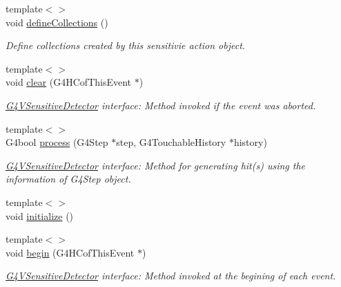\begin{DoxyCompactItemize}
{\footnotesize template$<$$>$ }\\void \hyperlink{class_d_d4hep_1_1_simulation_1_1_geant4_sensitive_action_a827b5e46eae9a7b69e91d6f0ee58733d}{defineCollections} ()
\begin{DoxyCompactList}\small\item\em Define collections created by this sensitivie action object. \item\end{DoxyCompactList}\item 
{\footnotesize template$<$$>$ }\\void \hyperlink{class_d_d4hep_1_1_simulation_1_1_geant4_sensitive_action_aa7ffb4125e622d9eb08bfd4901a643fd}{clear} (G4HCofThisEvent $\ast$)
\begin{DoxyCompactList}\small\item\em \hyperlink{class_g4_v_sensitive_detector}{G4VSensitiveDetector} interface: Method invoked if the event was aborted. \item\end{DoxyCompactList}\item 
{\footnotesize template$<$$>$ }\\G4bool \hyperlink{class_d_d4hep_1_1_simulation_1_1_geant4_sensitive_action_a66fa5dd6c3ea881689b16f73e9c7887b}{process} (G4Step $\ast$step, G4TouchableHistory $\ast$history)
\begin{DoxyCompactList}\small\item\em \hyperlink{class_g4_v_sensitive_detector}{G4VSensitiveDetector} interface: Method for generating hit(s) using the information of G4Step object. \item\end{DoxyCompactList}\item 
{\footnotesize template$<$$>$ }\\void \hyperlink{class_d_d4hep_1_1_simulation_1_1_geant4_sensitive_action_a07c8ad40e9cae09940a0397c091c2f45}{initialize} ()
\item 
{\footnotesize template$<$$>$ }\\void \hyperlink{class_d_d4hep_1_1_simulation_1_1_geant4_sensitive_action_aa038cfe9345e32eccee5b0022b2b48c4}{begin} (G4HCofThisEvent $\ast$)
\begin{DoxyCompactList}\small\item\em \hyperlink{class_g4_v_sensitive_detector}{G4VSensitiveDetector} interface: Method invoked at the begining of each event. \item\end{DoxyCompactList}\item 

\end{DoxyCompactItemize}
